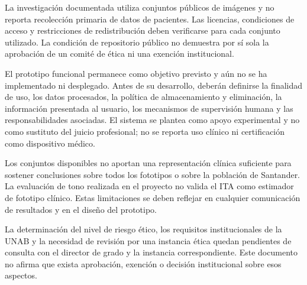 La investigación documentada utiliza conjuntos públicos de imágenes y no reporta recolección primaria de datos de pacientes. Las licencias, condiciones de acceso y restricciones de redistribución deben verificarse para cada conjunto utilizado. La condición de repositorio público no demuestra por sí sola la aprobación de un comité de ética ni una exención institucional.

El prototipo funcional permanece como objetivo previsto y aún no se ha implementado ni desplegado. Antes de su desarrollo, deberán definirse la finalidad de uso, los datos procesados, la política de almacenamiento y eliminación, la información presentada al usuario, los mecanismos de supervisión humana y las responsabilidades asociadas. El sistema se plantea como apoyo experimental y no como sustituto del juicio profesional; no se reporta uso clínico ni certificación como dispositivo médico.

Los conjuntos disponibles no aportan una representación clínica suficiente para sostener conclusiones sobre todos los fototipos o sobre la población de Santander. La evaluación de tono realizada en el proyecto no valida el ITA como estimador de fototipo clínico. Estas limitaciones se deben reflejar en cualquier comunicación de resultados y en el diseño del prototipo.

La determinación del nivel de riesgo ético, los requisitos institucionales de la UNAB y la necesidad de revisión por una instancia ética quedan pendientes de consulta con el director de grado y la instancia correspondiente. Este documento no afirma que exista aprobación, exención o decisión institucional sobre esos aspectos.
